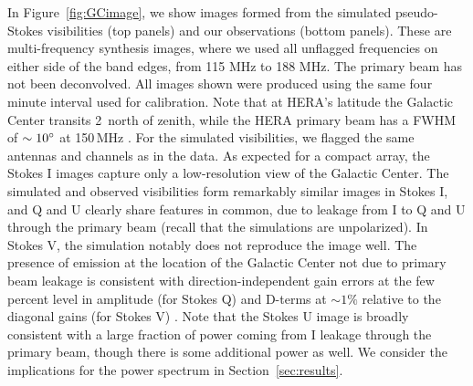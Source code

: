 \documentclass[twocolumn, trackchanges]{aastex61}
\begin{document}
{In Figure~\ref{fig:GCimage}, we show images formed from the simulated pseudo-Stokes visibilities (top panels) and our observations (bottom panels). 
These are multi-frequency synthesis images, where we used all unflagged frequencies on either side of the band edges, from 115 MHz to 188 MHz.  
The primary beam has not been deconvolved. 
All images shown were produced using the same four minute interval used for calibration.
Note that at HERA's latitude the Galactic Center transits 2\arcdeg\ north of zenith, while the HERA primary beam has a FWHM of $\sim10\mbox{$^\circ$}$ at 150\,MHz \citep{Neben.16}. For the simulated visibilities, we flagged the same antennas and channels as in the data. As expected for a compact array, the Stokes I images capture only a low-resolution view of the Galactic Center. The simulated and observed visibilities form remarkably similar images in Stokes I, and Q and U clearly share features in common, due to leakage from I to Q and U through the primary beam (recall that the simulations are unpolarized).  In Stokes V,  the simulation notably does not reproduce the image well. 
The presence of emission at the location of the Galactic Center not due to primary beam leakage is consistent with direction-independent gain errors at the few percent level in amplitude (for Stokes Q) and D-terms at $\sim 1\%$ relative to the diagonal gains (for Stokes V) \citep{TMS}.  Note that the Stokes U image is broadly consistent with a large fraction of power coming from I leakage through the primary beam, though there is some additional power as well.  We consider the implications for the power spectrum in Section~\ref{sec:results}.


}
\end{document}
